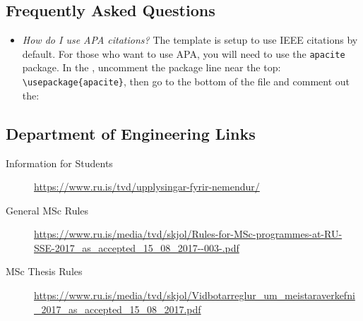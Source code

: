 \subsection{Frequently Asked Questions}
\begin{itemize}
\item {\em How do I use APA citations?}
  The template is setup to use IEEE citations by default.
  For those who want to use APA, you will need to use the \texttt{apacite} package.
  In the , uncomment the package line near the top: \verb|\usepackage{apacite}|, then go to the bottom of the file and comment out the: \verb||
\end{itemize}

\subsection{Department of Engineering Links}
\begin{description}
\item[Information for Students] \url{https://www.ru.is/tvd/upplysingar-fyrir-nemendur/}
\item[General MSc Rules] \url{https://www.ru.is/media/tvd/skjol/Rules-for-MSc-programmes-at-RU-SSE-2017_as_accepted_15_08_2017--003-.pdf}
\item[MSc Thesis Rules] \url{https://www.ru.is/media/tvd/skjol/Vidbotarreglur_um_meistaraverkefni_2017_as_accepted_15_08_2017.pdf}
\end{description}

